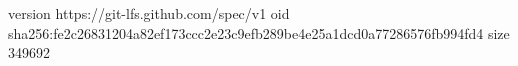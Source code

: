 version https://git-lfs.github.com/spec/v1
oid sha256:fe2c26831204a82ef173ccc2e23c9efb289be4e25a1dcd0a77286576fb994fd4
size 349692
